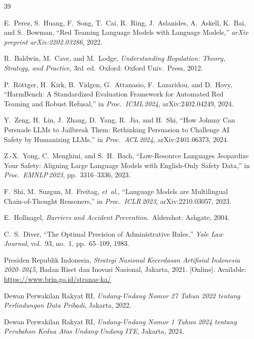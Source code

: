 ﻿\documentclass[conference]{IEEEtran}
\begin{document}
\begin{thebibliography}{39}

E.~Perez, S.~Huang, F.~Song, T.~Cai, R.~Ring, J.~Aslanides, A.~Askell,
K.~Bai, and S.~Bowman, ``Red Teaming Language Models with Language Models,''
\textit{arXiv preprint arXiv:2202.03286}, 2022.

R.~Baldwin, M.~Cave, and M.~Lodge, \textit{Understanding Regulation: Theory,
Strategy, and Practice}, 3rd~ed.\ Oxford: Oxford Univ.\ Press, 2012.

P.~R{\"o}ttger, H.~Kirk, B.~Vidgen, G.~Attanasio, F.~Lazaridou, and D.~Hovy,
``HarmBench: A Standardized Evaluation Framework for Automated Red Teaming
and Robust Refusal,'' in \textit{Proc.\ ICML\,2024}, arXiv:2402.04249, 2024.

Y.~Zeng, H.~Lin, J.~Zhang, D.~Yang, R.~Jia, and H.~Shi, ``How Johnny Can
Persuade LLMs to Jailbreak Them: Rethinking Persuasion to Challenge AI Safety
by Humanizing LLMs,'' in \textit{Proc.\ ACL\,2024}, arXiv:2401.06373, 2024.

Z.-X.~Yong, C.~Menghini, and S.~H.~Bach, ``Low-Resource Languages Jeopardize
Your Safety: Aligning Large Language Models with English-Only Safety Data,''
in \textit{Proc.\ EMNLP\,2023}, pp.~3316--3336, 2023.

F.~Shi, M.~Suzgun, M.~Freitag, \textit{et~al.}, ``Language Models are
Multilingual Chain-of-Thought Reasoners,'' in \textit{Proc.\ ICLR\,2023},
arXiv:2210.03057, 2023.

E.~Hollnagel, \textit{Barriers and Accident Prevention}.\ Aldershot: Ashgate,
2004.

C.~S.~Diver, ``The Optimal Precision of Administrative Rules,''
\textit{Yale Law Journal}, vol.~93, no.~1, pp.~65--109, 1983.

Presiden Republik Indonesia, \textit{Strategi Nasional Kecerdasan Artifisial
Indonesia 2020--2045}, Badan Riset dan Inovasi Nasional, Jakarta, 2021.
[Online]. Available: \url{https://www.brin.go.id/stranas-ka/}

Dewan Perwakilan Rakyat RI, \textit{Undang-Undang Nomor 27 Tahun 2022 tentang
Perlindungan Data Pribadi}, Jakarta, 2022.

Dewan Perwakilan Rakyat RI, \textit{Undang-Undang Nomor 1 Tahun 2024 tentang
Perubahan Kedua Atas Undang-Undang ITE}, Jakarta, 2024.


\end{thebibliography}
\end{document}
